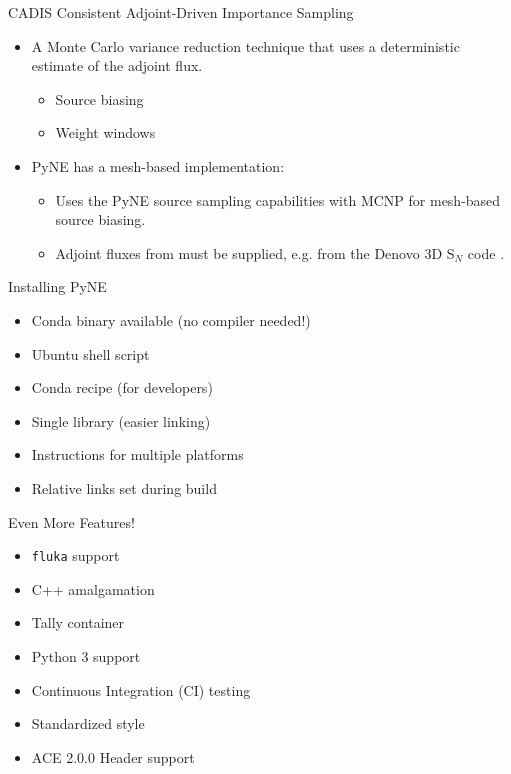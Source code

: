 \documentclass[xcolor=x11names,compress]{beamer}
\begin{document}
\begin{frame}{CADIS}
Consistent Adjoint-Driven Importance Sampling \cite{haghighat_monte_2003}
    \begin{itemize}
        \item{A Monte Carlo variance reduction technique that uses a deterministic estimate of the adjoint flux.}
        \begin{itemize}
            \item{Source biasing}
            \item{Weight windows}
        \end{itemize}
        \item{PyNE has a mesh-based implementation:}
        \begin{itemize}
            \item{Uses the PyNE source sampling capabilities with MCNP for mesh-based source biasing.}
            \item{Adjoint fluxes from must be supplied, e.g. from the Denovo 3D S$_N$ code \cite{Evans2010}.}
        \end{itemize}    
    \end{itemize}
\end{frame}


\begin{frame}{Installing PyNE}
  \Large
  \begin{itemize}
      \item Conda binary available (no compiler needed!)
      \item Ubuntu shell script
      \item Conda recipe (for developers)
      \item Single library (easier linking)
      \item Instructions for multiple platforms
      \item Relative links set during build
  \end{itemize}
\end{frame}


\begin{frame}{Even More Features!}
  \Large
    \begin{itemize}
        \item \texttt{fluka} support
        \item C++ amalgamation
        \item Tally container
        \item Python 3 support
        \item Continuous Integration (CI) testing
        \item Standardized style
        \item ACE 2.0.0 Header support
    \end{itemize}
\end{frame}
\end{document}

